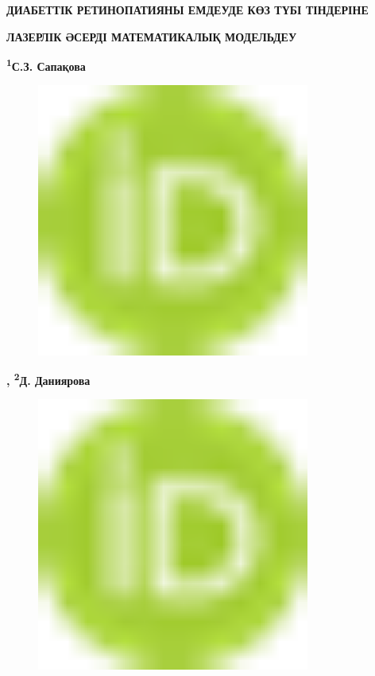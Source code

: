 
{\bfseries ДИАБЕТТІК РЕТИНОПАТИЯНЫ ЕМДЕУДЕ КӨЗ ТҮБІ ТІНДЕРІНЕ}

{\bfseries ЛАЗЕРЛІК ӘСЕРДІ МАТЕМАТИКАЛЫҚ МОДЕЛЬДЕУ}

{\bfseries \textsuperscript{1}С.З. Сапақова}

\begin{figure}[H]
	\centering
	\includegraphics[width=0.8\textwidth]{media/ict/image16}
	\caption*{}
\end{figure}
{\bfseries \textsuperscript{\envelope },
\textsuperscript{2}Д.
Даниярова}
\begin{figure}[H]
	\centering
	\includegraphics[width=0.8\textwidth]{media/ict/image16}
	\caption*{}
\end{figure}
